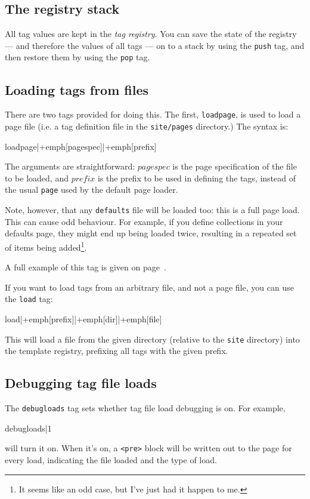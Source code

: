\subsection{The registry stack}
All tag values are kept in the \emph{tag registry}. You can save the state
of the registry --- and therefore the values of all tags --- on to a stack
by using the \texttt{push} tag, and then restore them by using the
\texttt{pop} tag.

\subsection{Loading tags from files}
There are two tags provided for doing this. The first, \texttt{loadpage},
is used to load a page file (i.e. a tag definition file in the \texttt{site/pages} 
directory.) The syntax is:
\begin{MyVerbatim}[commandchars=+\[\]]
{{loadpage|+emph[pagespec]|+emph[prefix]}}
\end{MyVerbatim}
The arguments are straightforward: $pagespec$ is the page specification
of the file to be loaded, and $prefix$ is the prefix to be used in defining
the tags, instead of the usual \texttt{page} used by the default page loader.

Note, however, that any \texttt{defaults} file will be loaded too: this is a full
page load. This can cause odd behaviour. For example, if you define collections in
your defaults page, they might end up being loaded twice, resulting in a repeated set of items
being added\footnote{It seems like an odd case, but I've just had it happen to me.}.

A full example of this tag is given on page~\pageref{loadpageexample}.

If you want to load tags from an arbitrary file, and not a page file,
you can use the \texttt{load} tag:
\begin{MyVerbatim}[commandchars=+\[\]]
{{load|+emph[prefix]|+emph[dir]|+emph[file]}}
\end{MyVerbatim}
This will load a file from the given directory (relative to the \texttt{site} directory) into the template registry,
prefixing all tags with the given prefix.

\subsection{Debugging tag file loads}
The \texttt{debugloads} tag sets whether tag file load debugging is on. For example,
\begin{MyVerbatim}
{{debugloads|1}}
\end{MyVerbatim}
will turn it on. When it's on, a \texttt{<pre>} block will be written out to the page
for every load, indicating the file loaded and the type of load.

